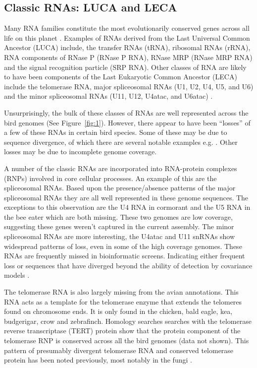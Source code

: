 \documentclass[10pt]{bmc_article}
\newenvironment{bmcformat}{\begin{raggedright}\baselineskip20pt\sloppy\setboolean{publ}{false}}{\end{raggedright}\baselineskip20pt\sloppy}
\begin{document}
\begin{bmcformat}
\subsection*{Classic RNAs: LUCA and LECA}

Many RNA families constitute the most evolutionarily conserved genes
across all life on this planet \cite{Jeffares:1998}. Examples of RNAs
derived from the Last Universal Common Ancestor (LUCA) include, the
transfer RNAs (tRNA), ribosomal RNAs (rRNA), RNA components of RNase P
(RNase P RNA), RNase MRP (RNase MRP RNA) and the signal recognition
particle (SRP RNA). Other classes of RNA are likely to have been
components of the Last Eukaryotic Common Ancestor (LECA) include the
telomerase RNA, major spliceosomal RNAs (U1, U2, U4, U5, and U6) and
the minor spliceosomal RNAs (U11, U12, U4atac, and U6atac)
\cite{Hoeppner:2012}.

Unsurprisingly, the bulk of these classes of RNAs are well represented
across the bird genomes (See Figure~\ref{fig:1}). However, there
appear to have been ``losses'' of a few of these RNAs in certain bird
species. Some of these may be due to sequence divergence, of which
there are several notable examples e.g.
\cite{Leonardi:2008,Webb:2008,Mao:,Lai:2010,Chan:2011}. Other losses
may be due to incomplete genome coverage.

A number of the classic RNAs are incorporated into RNA-protein
complexes (RNPs) involved in core cellular processes. An example of
this are the spliceosomal RNAs. Based upon the presence/absence
patterns of the major spliceosomal RNAs they are all well represented
in these genome sequences. The exceptions to this observation are the
U4 RNA in cormorant and the U5 RNA in the bee eater which are both
missing. These two genomes are low coverage, suggesting these
genes weren't captured in the current assembly. The minor spliceosomal
RNAs are more interesting, the U4atac and U11 snRNAs show widespread
patterns of loss, even in some of the high coverage genomes. These
RNAs are frequently missed in bioinformatic screens. Indicating either
frequent loss \cite{Davila_Lopez:2008} or sequences that have diverged
beyond the ability of detection by covariance models \cite{Marz:2008}.

The telomerase RNA is also largely missing from the avian
annotations. This RNA acts as a template for the telomerase enzyme
that extends the telomeres found on chromosome ends. It is only found
in the chicken, bald eagle, kea, budgerigar, crow and
zebrafinch. Homology searches searches with the telomerase reverse
transcriptase (TERT) protein show that the protein component of the
telomerase RNP is conserved across all the bird genomes (data not
shown). This pattern of presumably divergent telomerase RNA and
conserved telomerase protein has been noted previously, most notably
in the fungi \cite{Leonardi:2008,Webb:2008}.


\end{bmcformat}
\end{document}
